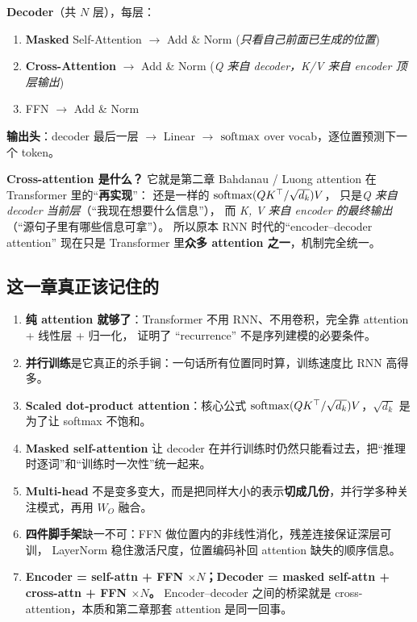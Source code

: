 \textbf{Decoder}（共 $N$ 层），每层：
\begin{enumerate}
  \item \textbf{Masked} Self-Attention $\to$ Add \& Norm \quad(\emph{只看自己前面已生成的位置})
  \item \textbf{Cross-Attention} $\to$ Add \& Norm \quad(\emph{Q 来自 decoder，K/V 来自 encoder 顶层输出})
  \item FFN $\to$ Add \& Norm
\end{enumerate}

\textbf{输出头}：decoder 最后一层 $\to$ Linear $\to$ $\mathrm{softmax}$ over vocab，逐位置预测下一个 token。

\begin{keypointblock}
\textbf{Cross-attention 是什么？}
它就是第二章 Bahdanau / Luong attention 在 Transformer 里的``\textbf{再实现}''：
还是一样的 $\mathrm{softmax}(QK^\top/\sqrt{d_k})V$，
只是\emph{Q 来自 decoder 当前层}（``我现在想要什么信息''），
而 \emph{K, V 来自 encoder 的最终输出}（``源句子里有哪些信息可拿''）。
所以原本 RNN 时代的``encoder--decoder attention'' 现在只是 Transformer 里\textbf{众多 attention 之一}，机制完全统一。
\end{keypointblock}

\subsection{这一章真正该记住的}
\label{subsec:ch03-takeaways}

\begin{enumerate}
  \item \textbf{纯 attention 就够了}：Transformer 不用 RNN、不用卷积，完全靠 attention + 线性层 + 归一化，
        证明了 ``recurrence'' 不是序列建模的必要条件。
  \item \textbf{并行训练}是它真正的杀手锏：一句话所有位置同时算，训练速度比 RNN 高得多。
  \item \textbf{Scaled dot-product attention}：核心公式 $\mathrm{softmax}(QK^\top/\sqrt{d_k})V$，$\sqrt{d_k}$ 是为了让 softmax 不饱和。
  \item \textbf{Masked self-attention} 让 decoder 在并行训练时仍然只能看过去，把``推理时逐词''和``训练时一次性''统一起来。
  \item \textbf{Multi-head} 不是变多变大，而是把同样大小的表示\textbf{切成几份}，并行学多种关注模式，再用 $W_O$ 融合。
  \item \textbf{四件脚手架}缺一不可：FFN 做位置内的非线性消化，残差连接保证深层可训，
        LayerNorm 稳住激活尺度，位置编码补回 attention 缺失的顺序信息。
  \item \textbf{Encoder = self-attn + FFN $\times N$；Decoder = masked self-attn + cross-attn + FFN $\times N$。}
        Encoder--decoder 之间的桥梁就是 cross-attention，本质和第二章那套 attention 是同一回事。
\end{enumerate}
